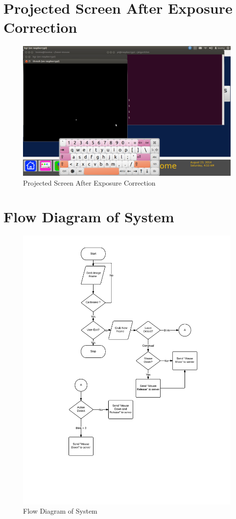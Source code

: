 \documentclass[12pt, a4paper]{article}
\begin{document}
\begin{appendices}
\section{Projected Screen After Exposure Correction}
\begin{figure}[htp]
\includegraphics[scale=0.30]{projectorwithout.png}
\caption{Projected Screen After Exposure Correction}
\label{}
\end{figure}
\newpage
\section{Flow Diagram of System}
\begin{figure}[htp]
\centering
\includegraphics[scale=0.62]{flow.png}
\caption{Flow Diagram of System}
\label{}
\end{figure}
\end{appendices}
\end{document}

